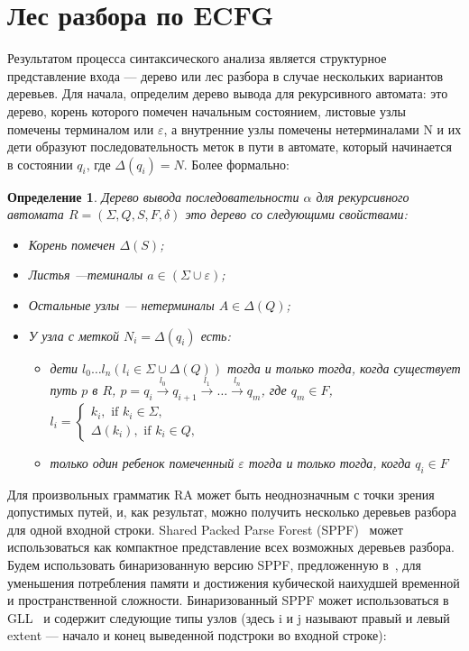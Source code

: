 \documentclass[14pt]{matmex-diploma-custom}
\newtheorem{mydef}{Определение}
\begin{document}
	\section{Лес разбора по ECFG}
	Результатом процесса синтаксического анализа является структурное представление 
	входа --- дерево или лес разбора в случае нескольких вариантов деревьев.
	Для начала, определим дерево вывода для рекурсивного автомата: 
	это дерево, корень которого помечен начальным состоянием, листовые узлы помечены
	терминалом или $\varepsilon$, а внутренние узлы помечены нетерминалами N и их
	дети образуют последовательность меток в пути в автомате, который начинается в 
	состоянии $q_i$, где $ \Delta(q_i) = N $. Более формально:
	
	\begin{mydef}
		
		Дерево вывода последовательности $\alpha$ для рекурсивного автомата $R=(\Sigma, Q, S, F, \delta)$ это дерево со следующими свойствами:
		
		\begin{itemize}
			\item Корень помечен $\Delta(S)$;
			\item Листья ---теминалы $a\in (\Sigma \cup \varepsilon)$;
			\item Остальные узлы --- нетерминалы $A\in \Delta(Q)$;
			\item У узла с меткой $N_i = \Delta(q_i)$ есть:
			\begin{itemize}
				\item 
				дети $l_0 \dots l_n (l_i \in \Sigma \cup \Delta(Q))$ тогда и только тогда,
				когда существует путь $p$ в $R$, $p = q_i \xrightarrow[]{l_0} q_{i+1} \xrightarrow[]{l_1} \dots \xrightarrow{l_n} q_m$, где
				$q_m \in F$, $l_i = 
				\left\{
				\begin{matrix}
				k_i, \text{ if }  k_i \in \Sigma,\\
				\Delta(k_i), \text{ if } k_i \in Q,
				\end{matrix}
				\right.
				$
				\item только один ребенок помеченный $\varepsilon$ тогда и только тогда,
				когда $ q_i \in F $
			\end{itemize}
		\end{itemize}
	\end{mydef}
	Для произвольных грамматик RA может быть неоднозначным с точки зрения допустимых путей,
	и, как результат, можно получить несколько деревьев разбора для одной входной строки.
	Shared Packed Parse Forest (SPPF)~\cite{SPPF} может использоваться как компактное
	представление всех возможных деревьев разбора. Будем использовать бинаризованную версию SPPF,
	предложенную в~\cite{brnglr}, для уменьшения потребления памяти и достижения кубической
	наихудшей временной и пространственной сложности. Бинаризованный SPPF может использоваться
	в GLL~\cite{scott2013gll} и содержит следующие типы узлов (здесь i и j называют правый и
	левый extent --- начало и конец выведенной подстроки во входной строке):
	
\end{document}
